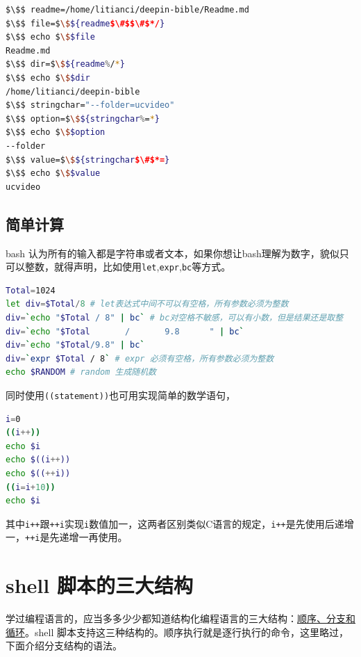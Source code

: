 \documentclass[doctor,openright,twoside]{sjtuthesis}
\newcommand{\passthrough}[1]{#1}
\theoremstyle{plain}
\theoremstyle{definition}
\theoremstyle{remark}
\theoremstyle{ocrenumbox}
\theoremstyle{plain}
\begin{document}
\lstset{mathescape=true}

\begin{lstlisting}[language=bash]
$\$$ readme=/home/litianci/deepin-bible/Readme.md
$\$$ file=$\$${readme$\#$$\#$*/}
$\$$ echo $\$$file 
Readme.md
$\$$ dir=$\$${readme%/*}
$\$$ echo $\$$dir
/home/litianci/deepin-bible
$\$$ stringchar="--folder=ucvideo"
$\$$ option=$\$${stringchar%=*}
$\$$ echo $\$$option
--folder
$\$$ value=$\$${stringchar$\#$*=}
$\$$ echo $\$$value
ucvideo
\end{lstlisting}

\lstset{mathescape=false}

\subsection{简单计算}

bash
认为所有的输入都是字符串或者文本，如果你想让bash理解为数字，貌似只可以整数，就得声明，比如使用\passthrough{\lstinline!let!},\passthrough{\lstinline!expr!},\passthrough{\lstinline!bc!}等方式。

\begin{lstlisting}[language=bash]
Total=1024
let div=$Total/8 # let表达式中间不可以有空格，所有参数必须为整数
div=`echo "$Total / 8" | bc` # bc对空格不敏感，可以有小数，但是结果还是取整
div=`echo "$Total       /       9.8      " | bc`
div=`echo "$Total/9.8" | bc`
div=`expr $Total / 8` # expr 必须有空格，所有参数必须为整数
echo $RANDOM # random 生成随机数
\end{lstlisting}

同时使用\passthrough{\lstinline!((statement))!}也可用实现简单的数学语句，

\begin{lstlisting}[language=bash]
i=0
((i++))
echo $i
echo $((i++))
echo $((++i))
((i=i+10))
echo $i
\end{lstlisting}

其中\passthrough{\lstinline!i++!}跟\passthrough{\lstinline!++i!}实现\passthrough{\lstinline!i!}数值加一，这两者区别类似C语言的规定，\passthrough{\lstinline!i++!}是先使用后递增一，\passthrough{\lstinline!++i!}是先递增一再使用。

\hypertarget{shell-}{%
\section{shell 脚本的三大结构}\label{shell-}}

学过编程语言的，应当多多少少都知道结构化编程语言的三大结构：\href{https://en.wikipedia.org/wiki/Structured_programming}{顺序、分支和循环}。shell
脚本支持这三种结构的。顺序执行就是逐行执行的命令，这里略过，下面介绍分支结构的语法。
\end{document}
